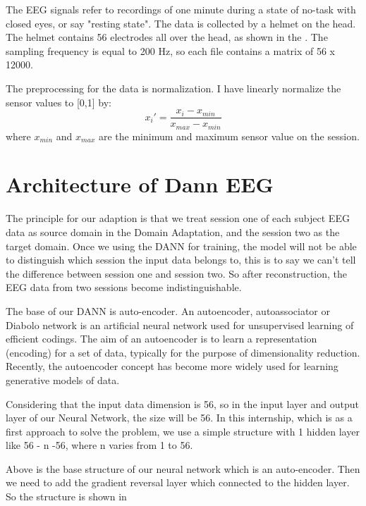 The EEG signals refer to recordings of one minute during a state of no-task with closed eyes, or say "resting state". The data is collected by a helmet on the head. The helmet contains 56 electrodes all over the head, as shown in the . The sampling frequency is equal to 200 Hz, so each file contains a matrix of 56 x 12000. 

The preprocessing for the data is normalization. I have linearly normalize the sensor values to [0,1] by:
\[ x_{i}' = \frac{x_{i}-x_{min}}{x_{max}-x_{min}} \] 
where $ x_{min} $ and $ x_{max} $ are the minimum and maximum sensor value on the session.

\section{Architecture of Dann EEG}
The principle for our adaption is that we treat session one of each subject EEG data as source domain in the Domain Adaptation, and the session two as the target domain. Once we using the DANN for training, the model will not be able to distinguish which session the input data belongs to, this is to say we can't tell the difference between session one and session two. So after reconstruction, the EEG data from two sessions become indistinguishable.

The base of our DANN is auto-encoder. An autoencoder, autoassociator or Diabolo network\cite{bengio2009learning} is an artificial neural network used for unsupervised learning of efficient codings.\cite{liou2008modeling} The aim of an autoencoder is to learn a representation (encoding) for a set of data, typically for the purpose of dimensionality reduction. Recently, the autoencoder concept has become more widely used for learning generative models of data.\cite{kingma2013auto}

Considering that the input data dimension is 56, so in the input layer and output layer of our Neural Network, the size will be 56. In this internship, which is as a first approach to solve the problem, we use a simple structure with 1 hidden layer like 56 - n -56, where n varies from 1 to 56. 

Above is the base structure of our neural network which is an auto-encoder. Then we need to add the gradient reversal layer which connected to the hidden layer. So the structure is shown in 

